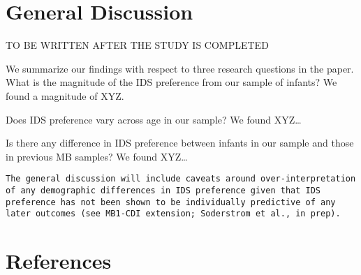 \documentclass[
  ,man,floatsintext]{apa6}
\newlength{\cslhangindent}
\newlength{\cslentryspacingunit} %
\newenvironment{CSLReferences}[2] %
 {%
  \setlength{\parindent}{0pt}
  \ifodd #1
  \let\oldpar\par
  \def\par{\hangindent=\cslhangindent\oldpar}
  \fi
  \setlength{\parskip}{#2\cslentryspacingunit}
 }%
 {}
\begin{document}
\hypertarget{general-discussion}{%
\section{General Discussion}\label{general-discussion}}

TO BE WRITTEN AFTER THE STUDY IS COMPLETED

We summarize our findings with respect to three research questions in the paper.
What is the magnitude of the IDS preference from our sample of infants? We found a magnitude of XYZ.

Does IDS preference vary across age in our sample? We found XYZ\ldots{}

Is there any difference in IDS preference between infants in our sample and those in previous MB samples? We found XYZ\ldots{}

\begin{verbatim}
The general discussion will include caveats around over-interpretation of any demographic differences in IDS preference given that IDS preference has not been shown to be individually predictive of any later outcomes (see MB1-CDI extension; Soderstrom et al., in prep). 
\end{verbatim}

\newpage

\hypertarget{references}{%
\section{References}\label{references}}

\begingroup
\setlength{\parindent}{-0.5in}
\setlength{\leftskip}{0.5in}

\hypertarget{refs}{}
\begin{CSLReferences}{0}{0}
\end{CSLReferences}

\endgroup
\end{document}
